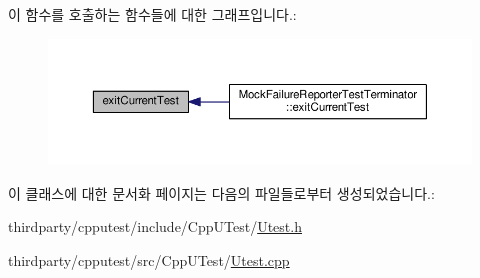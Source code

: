 이 함수를 호출하는 함수들에 대한 그래프입니다.\+:
\nopagebreak
\begin{figure}[H]
\begin{center}
\leavevmode
\includegraphics[width=350pt]{class_normal_test_terminator_aea055d15b583b4c75114d737d94d2f53_icgraph}
\end{center}
\end{figure}




이 클래스에 대한 문서화 페이지는 다음의 파일들로부터 생성되었습니다.\+:\begin{DoxyCompactItemize}
\item 
thirdparty/cpputest/include/\+Cpp\+U\+Test/\hyperlink{_utest_8h}{Utest.\+h}\item 
thirdparty/cpputest/src/\+Cpp\+U\+Test/\hyperlink{_utest_8cpp}{Utest.\+cpp}\end{DoxyCompactItemize}
